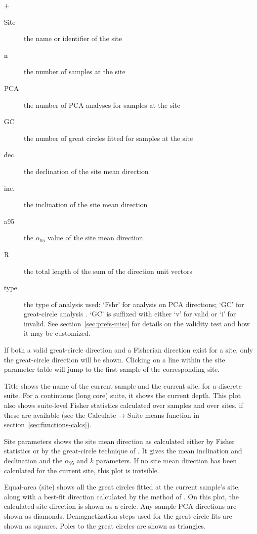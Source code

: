 \documentclass[a4paper,british]{article}
\newcommand{\menuitemlabel}[1]{%
\mbox{\textsf{#1}}\hfil}
\newenvironment{menuitemlist}%
{\begin{list}{}{%
\renewcommand{\makelabel}{\menuitemlabel}%
\setlength{\labelwidth}{35pt}%
\setlength{\leftmargin}%
             {\labelwidth+\labelsep}}}%
{\end{list}}
\newcommand{\ppcmd}[1]{\textsf{#1}} %
\newcommand{\caps}[1]{\MakeTextUppercase{#1}} %
\newcommand{\submenu}{ \textrm{→} }
\newcommand{\alnifi}{$\alpha_{95}$}
\begin{document}
\begin{menuitemlist}
  \begin{description}
  \item[Site] the name or identifier of the site
  \item[n] the number of samples at the site
  \item[\caps{pca}] the number of \caps{pca} analyses for samples at the site
  \item[GC] the number of great circles fitted for samples at the site
  \item[dec.] the declination of the site mean direction
  \item[inc.] the inclination of the site mean direction
  \item[a95] the \alnifi{} value of the site mean direction
  \item[R] the total length of the sum of the direction unit vectors
  \item[type] the type of analysis used: `Fshr' for \cite{fisher1953sphere}
    analysis on \caps{pca} directions; `GC' for great-circle analysis
    \citep{mcfadden1988circles}. `GC' is suffixed with either `v' for valid
    or `i' for invalid. See section~\ref{sec:prefs-misc} for details on the
    validity test and how it may be customized.
  \end{description}

  If both a valid great-circle direction and a Fisherian direction exist
  for a site, only the great-circle direction will be shown. Clicking on
  a line within the site parameter table will jump to the first sample
  of the corresponding site.

\item[Title] shows the name of the current sample and the current site,
  for a discrete suite. For a continuous (long core) suite, it shows the
  current depth. This plot also shows suite-level Fisher statistics
  calculated over samples and over sites, if these are available (see
  the \ppcmd{Calculate\submenu Suite means} function in
  section~\ref{sec:functions-calcs}).

\item[Site parameters] shows the site mean direction as calculated either by
  Fisher statistics or by the great-circle technique of
  \cite{mcfadden1988circles}. It gives the mean inclination and declination
  and the \alnifi{} and $k$ parameters. If no site mean direction has been
  calculated for the current site, this plot is invisible.

\item[Equal-area (site)] shows all the great circles fitted at the current
  sample's site, along with a best-fit direction calculated by the method of
  \cite{mcfadden1988circles}. On this plot, the calculated site direction is
  shown as a circle. Any sample PCA directions are shown as diamonds.
  Demagnetization steps used for the great-circle fits are shown as squares.
  Poles to the great circles are shown as triangles.


\end{menuitemlist}
\end{document}
